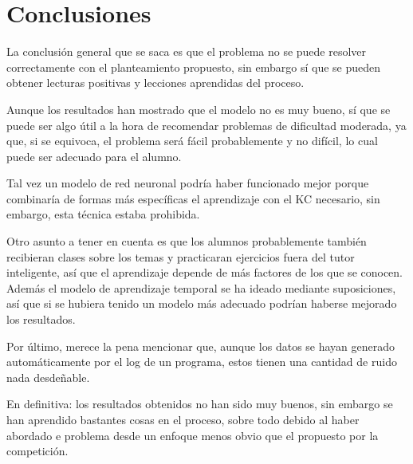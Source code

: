 \documentclass[acmtog, screen]{acmart}
\begin{document}
\section{Conclusiones}
La conclusión general que se saca es que el problema no se puede resolver correctamente con el planteamiento propuesto, sin embargo sí que se pueden obtener lecturas positivas y lecciones aprendidas del proceso.

Aunque los resultados han mostrado que el modelo no es muy bueno, sí que se puede ser algo útil a la hora de recomendar problemas de dificultad moderada, ya que, si se equivoca, el problema será fácil probablemente y no difícil, lo cual puede ser adecuado para el alumno.

Tal vez un modelo de red neuronal podría haber funcionado mejor porque combinaría de formas más específicas el aprendizaje con el KC necesario, sin embargo, esta técnica estaba prohibida.

Otro asunto a tener en cuenta es que los alumnos probablemente también recibieran clases sobre los temas y practicaran ejercicios fuera del tutor inteligente, así que el aprendizaje depende de más factores de los que se conocen. Además el modelo de aprendizaje temporal se ha ideado mediante suposiciones, así que si se hubiera tenido un modelo más adecuado podrían haberse mejorado los resultados.

Por último, merece la pena mencionar que, aunque los datos se hayan generado automáticamente por el log de un programa, estos tienen una cantidad de ruido nada desdeñable.

En definitiva: los resultados obtenidos no han sido muy buenos, sin embargo se han aprendido bastantes cosas en el proceso, sobre todo debido al haber abordado e problema desde un enfoque menos obvio que el propuesto por la competición.
\end{document}
